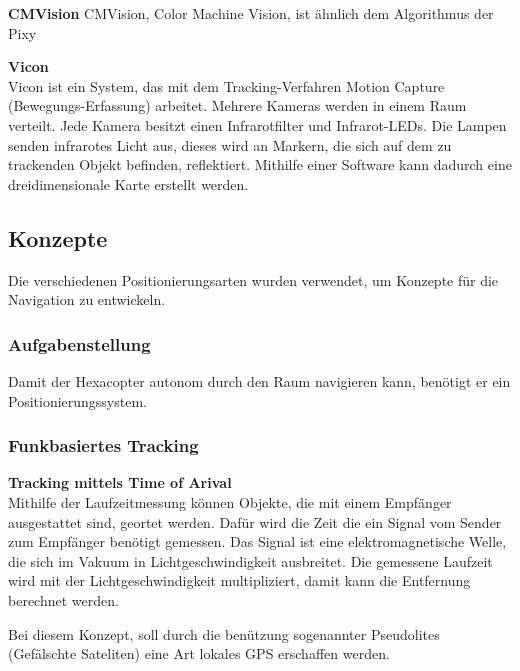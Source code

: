     \textbf{CMVision}
    CMVision, Color Machine Vision, ist ähnlich dem Algorithmus der Pixy

    \cite{Pixy}
    \cite{Pixy_Verfahren}
    \cite{Pixy_Verfahren2}

    \textbf{Vicon}\\
    Vicon ist ein System, das mit dem Tracking-Verfahren Motion Capture (Bewegungs-Erfassung) arbeitet. 
    Mehrere Kameras werden in einem Raum verteilt. Jede Kamera besitzt einen Infrarotfilter und Infrarot-LEDs. Die Lampen senden infrarotes Licht aus, dieses wird an Markern, die sich auf dem zu trackenden Objekt befinden, reflektiert. Mithilfe einer Software kann dadurch eine dreidimensionale Karte erstellt werden.
    \cite{Vicon}

  \subsection{Konzepte}
  Die verschiedenen Positionierungsarten wurden verwendet, um Konzepte für die Navigation zu entwickeln.

    \subsubsection{Aufgabenstellung}
    Damit der Hexacopter autonom durch den Raum navigieren kann, benötigt er ein Positionierungssystem.

    \subsubsection{Funkbasiertes Tracking}

      \textbf{Tracking mittels Time of Arival}\\

      Mithilfe der Laufzeitmessung können Objekte, die mit einem Empfänger ausgestattet sind, geortet werden. Dafür wird die Zeit die ein Signal vom Sender zum Empfänger benötigt gemessen. Das Signal ist eine elektromagnetische Welle, die sich im Vakuum in Lichtgeschwindigkeit ausbreitet. Die gemessene Laufzeit wird mit der Lichtgeschwindigkeit multipliziert, damit kann die Entfernung berechnet werden. 

      Bei diesem Konzept, soll durch die benützung sogenannter Pseudolites (Gefälschte Sateliten) eine Art lokales GPS erschaffen werden.

